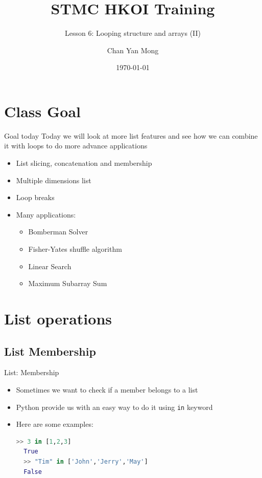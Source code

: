 \documentclass[10pt,xcolor={table,dvipsnames},t]{beamer}
\title[Your Short Title]{STMC HKOI Training}
\subtitle{Lesson 6: Looping structure and arrays (II)}
\author{Chan Yan Mong}
\date{\today}
\begin{document}
\begin{frame}
  \titlepage
\end{frame}


\section{Class Goal}

\begin{frame}{Goal today}
Today we will look at more list features and see how we can combine it with loops to do more advance applications
\begin{itemize}
  \item List slicing, concatenation and membership
  \item Multiple dimensions list
  \item Loop breaks
  \item Many applications:
  \begin{itemize}
    \item Bomberman Solver 
    \item Fisher-Yates shuffle algorithm
    \item Linear Search
    \item Maximum Subarray Sum
  \end{itemize}
\end{itemize}

\end{frame}


\section{List operations}
\subsection{List Membership}
\begin{frame}[fragile]{List: Membership}
  \begin{itemize}
    \item Sometimes we want to check if a member belongs to a list
    \item Python provide us with an easy way to do it using \texttt{in} keyword
    \item Here are some examples:
\begin{lstlisting}[language=python]
  >> 3 in [1,2,3]
  True
  >> "Tim" in ['John','Jerry','May']
  False
\end{lstlisting}
  \end{itemize}
\end{frame}
\end{document}
